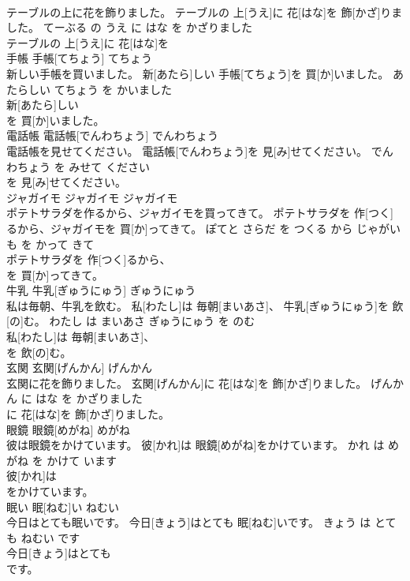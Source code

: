 \documentclass[8pt]{extreport}
\begin{document}
\begin{CJK}{UTF8}{min}
\\	テーブルの上に花を飾りました。	テーブルの 上[うえ]に 花[はな]を 飾[かざ]りました。	てーぶる の うえ に はな を かざりました	
\\	テーブルの 上[うえ]に 花[はな]を
\\	手帳	手帳[てちょう]	てちょう	
\\	新しい手帳を買いました。	新[あたら]しい 手帳[てちょう]を 買[か]いました。	あたらしい てちょう を かいました	
\\	新[あたら]しい
\\	を 買[か]いました。		
\\	電話帳	電話帳[でんわちょう]	でんわちょう	
\\	電話帳を見せてください。	電話帳[でんわちょう]を 見[み]せてください。	でんわちょう を みせて ください	
\\	を 見[み]せてください。		
\\	ジャガイモ	ジャガイモ	ジャガイモ	
\\	ポテトサラダを作るから、ジャガイモを買ってきて。	ポテトサラダを 作[つく]るから、ジャガイモを 買[か]ってきて。	ぽてと さらだ を つくる から じゃがいも を かって きて	
\\	ポテトサラダを 作[つく]るから、
\\	を 買[か]ってきて。		
\\	牛乳	牛乳[ぎゅうにゅう]	ぎゅうにゅう	
\\	私は毎朝、牛乳を飲む。	私[わたし]は 毎朝[まいあさ]、 牛乳[ぎゅうにゅう]を 飲[の]む。	わたし は まいあさ ぎゅうにゅう を のむ	
\\	私[わたし]は 毎朝[まいあさ]、
\\	を 飲[の]む。		
\\	玄関	玄関[げんかん]	げんかん	
\\	玄関に花を飾りました。	玄関[げんかん]に 花[はな]を 飾[かざ]りました。	げんかん に はな を かざりました	
\\	に 花[はな]を 飾[かざ]りました。		
\\	眼鏡	眼鏡[めがね]	めがね	
\\	彼は眼鏡をかけています。	彼[かれ]は 眼鏡[めがね]をかけています。	かれ は めがね を かけて います	
\\	彼[かれ]は
\\	をかけています。		
\\	眠い	眠[ねむ]い	ねむい	
\\	今日はとても眠いです。	今日[きょう]はとても 眠[ねむ]いです。	きょう は とても ねむい です	
\\	今日[きょう]はとても
\\	です。		

\end{CJK}
\end{document}
